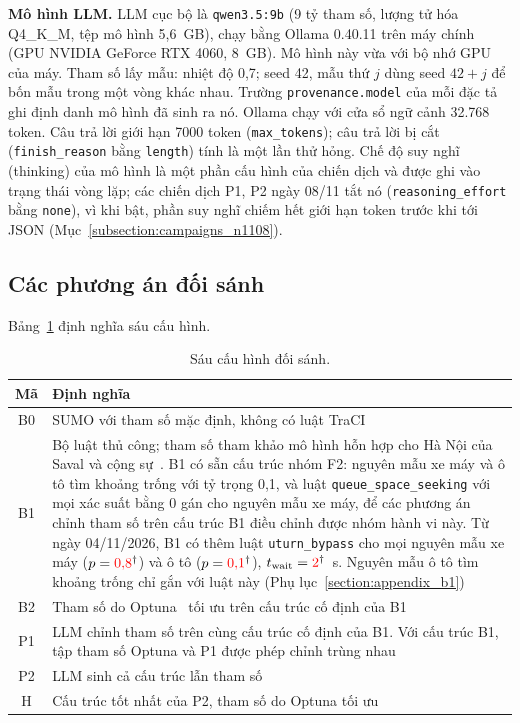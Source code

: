 \documentclass[../main.tex]{subfiles}
\begin{document}
\textbf{Mô hình LLM.} LLM cục bộ là \texttt{qwen3.5:9b} (9 tỷ tham số, lượng tử hóa Q4\_K\_M, tệp mô hình 5,6~GB), chạy bằng Ollama 0.40.11 trên máy chính (GPU NVIDIA GeForce RTX 4060, 8~GB). Mô hình này vừa với bộ nhớ GPU của máy. Tham số lấy mẫu: nhiệt độ 0,7; seed 42, mẫu thứ $j$ dùng seed $42 + j$ để bốn mẫu trong một vòng khác nhau. Trường \texttt{provenance.model} của mỗi đặc tả ghi định danh mô hình đã sinh ra nó. Ollama chạy với cửa sổ ngữ cảnh 32.768 token. Câu trả lời giới hạn 7000 token (\texttt{max\_tokens}); câu trả lời bị cắt (\texttt{finish\_reason} bằng \texttt{length}) tính là một lần thử hỏng. Chế độ suy nghĩ (thinking) của mô hình là một phần cấu hình của chiến dịch và được ghi vào trạng thái vòng lặp; các chiến dịch P1, P2 ngày 08/11 tắt nó (\texttt{reasoning\_effort} bằng \texttt{none}), vì khi bật, phần suy nghĩ chiếm hết giới hạn token trước khi tới JSON (Mục~\ref{subsection:campaigns_n1108}).

\subsection{Các phương án đối sánh}

Bảng~\ref{table:3.4} định nghĩa sáu cấu hình.

\begin{table}[ht]
\centering
\small
\caption{Sáu cấu hình đối sánh.}
\label{table:3.4}
\begin{tabular}{|c|p{12.5cm}|}
\hline
\textbf{Mã} & \textbf{Định nghĩa} \\
\hline
B0 & SUMO với tham số mặc định, không có luật TraCI \\
\hline
B1 & Bộ luật thủ công; tham số tham khảo mô hình hỗn hợp cho Hà Nội của Saval và cộng sự~\cite{saval2023mixed}. B1 có sẵn cấu trúc nhóm F2: nguyên mẫu xe máy và ô tô tìm khoảng trống với tỷ trọng 0,1, và luật \texttt{queue\_space\_seeking} với mọi xác suất bằng 0 gán cho nguyên mẫu xe máy, để các phương án chỉnh tham số trên cấu trúc B1 điều chỉnh được nhóm hành vi này. Từ ngày 04/11/2026, B1 có thêm luật \texttt{uturn\_bypass} cho mọi nguyên mẫu xe máy ($p = \textcolor{red}{0{,}8}^{\dagger}$) và ô tô ($p = \textcolor{red}{0{,}1}^{\dagger}$), $t_{\text{wait}} = \textcolor{red}{2}^{\dagger}$~s. Nguyên mẫu ô tô tìm khoảng trống chỉ gắn với luật này (Phụ lục~\ref{section:appendix_b1}) \\
\hline
B2 & Tham số do Optuna~\cite{akiba2019optuna} tối ưu trên cấu trúc cố định của B1 \\
\hline
P1 & LLM chỉnh tham số trên cùng cấu trúc cố định của B1. Với cấu trúc B1, tập tham số Optuna và P1 được phép chỉnh trùng nhau \\
\hline
P2 & LLM sinh cả cấu trúc lẫn tham số \\
\hline
H & Cấu trúc tốt nhất của P2, tham số do Optuna tối ưu \\
\hline
\end{tabular}
\end{table}
\end{document}
